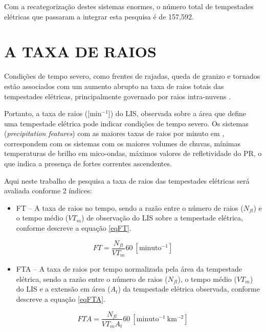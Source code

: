 Com a recategorização destes sistemas enormes, o número total de tempestades elétricas que passaram a integrar esta pesquisa é de 157,592.


\section{A TAXA DE RAIOS}
\label{metodoFtaFt}


Condições de tempo severo, como frentes de rajadas, queda de granizo e tornados estão associados com um aumento abrupto na taxa de raios totais das tempestades elétricas, principalmente governado por raios intra-nuvens \cite{macgorman1989,carey1998,williams1999}.   

Portanto, a taxa de raios ([min$^{-1}$]) do LIS, observada sobre a área que define uma tempestade elétrica pode indicar condições de tempo severo. Os sistemas (\textit{precipitation features}) com as maiores 
taxas de raios por minuto em , correspondem com os sistemas com os maiores volumes de chuvas, mínimas temperaturas de brilho em mico-ondas, máximos valores de refletividade do PR, o que indica a presença de fortes correntes ascendentes. 

Aqui neste trabalho de pesquisa a taxa de raios das tempestades elétricas será avaliada conforme 2 índices:

\begin{itemize}
\item FT -- A taxa de raios no tempo, sendo a razão entre o número de raios ($N_{fl}$) e o tempo médio ($VT_m$) de observação do LIS sobre a tempestade elétrica, conforme descreve a equação \ref{eqFT}.
\end{itemize}

\begin{equation}
FT = \frac{N_{fl} }{VT_m} 60 ~[\mathrm{minuto^{-1}}]  
\label{eqFT}  
\end{equation}

\begin{itemize}
\item FTA -- A taxa de raios por tempo normalizada pela área da tempestade elétrica, sendo a razão entre o número de raios ($N_{fl}$), o tempo médio ($VT_m$) do LIS e a extensão em área ($A_t$) da tempestade elétrica observada, conforme descreve a equação \ref{eqFTA}.
\end{itemize}

\begin{equation}
FTA = \frac{N_{fl} }{VT_m A_t } 60 ~[\mathrm{minuto^{-1}~km^{-2}}]
\label{eqFTA}
\end{equation}

